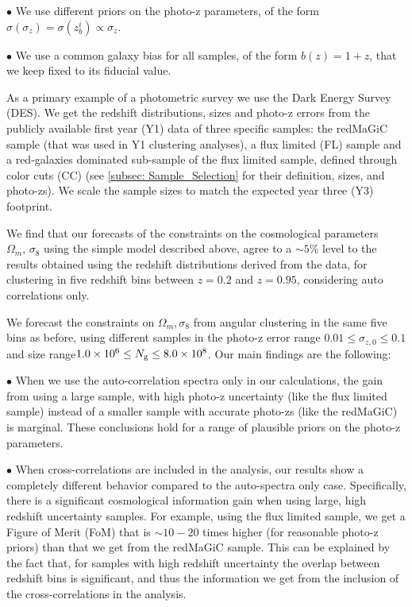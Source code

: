 \documentclass[a4paper,fleqn,usenatbib]{mnras}
\begin{document}
$\bullet$ We use different priors on the photo-z parameters, of the form $\sigma(\sigma_z) = \sigma(z_b^i) \propto \sigma_z$.

$\bullet$ We use a common galaxy bias for all samples, of the form $b(z) = 1+ z$, that we keep fixed to its fiducial value. 


As a primary example of a photometric survey we use the Dark Energy Survey (DES). We get the redshift distributions, sizes and photo-z errors from the publicly available first year (Y1) data of three specific samples: the redMaGiC sample (that was used in Y1 clustering analyses), a flux limited (FL) sample and a red-galaxies dominated sub-sample of the flux limited sample, defined through color cuts (CC) (see \ref{subsec: Sample_Selection} for their definition, sizes, and photo-zs). We scale the sample sizes to match the expected year three (Y3) footprint. 

We find that our forecasts of the constraints on the cosmological parameters $\Omega_m,\, \sigma_8$ using the simple model described above, agree to a $\sim 5 \%$ level to the results obtained using the redshift distributions derived from the data, for clustering in five redshift bins between $z = 0.2$ and $z = 0.95$, considering auto correlations only.

We forecast the constraints on $\Omega_m, \sigma_8$ from angular clustering in the same five bins as before, using different samples in the photo-z error range $0.01 \leq \sigma_{z,0} \leq 0.1$ and size range$1.0 \times 10^6 \leq N_{\mbox{\scriptsize{g}}} \leq 8.0 \times 10^8$. Our main findings are the following:

$\bullet$ When we use the auto-correlation spectra only in our calculations, the gain from using a large sample, with high photo-z uncertainty (like the flux limited sample) instead of a smaller sample with accurate photo-zs (like the redMaGiC) is marginal. These conclusions hold for a range of plausible priors on the photo-z parameters.

$\bullet$ When cross-correlations are included in the analysis, our results show a completely different behavior compared to the auto-spectra only case. Specifically, there is a significant cosmological information gain when using large, high redshift uncertainty samples. For example, using the flux limited sample, we get a Figure of Merit (FoM) that is $\sim 10 - 20$ times higher (for reasonable photo-z priors) than that we get from the redMaGiC sample. This can be explained by the fact that, for samples with high redshift uncertainty the overlap between redshift bins is significant, and thus the information we get from the inclusion of the cross-correlations in the analysis.
\end{document}
